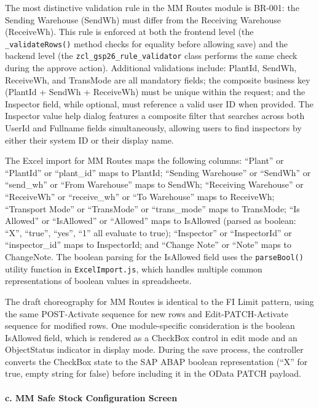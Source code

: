 \documentclass[12pt,a4paper]{report}
\begin{document}
The most distinctive validation rule in the MM Routes module is BR-001: the Sending Warehouse (SendWh) must differ from the Receiving Warehouse (ReceiveWh). This rule is enforced at both the frontend level (the \texttt{\_validateRows()} method checks for equality before allowing save) and the backend level (the \texttt{zcl\_gsp26\_rule\_validator} class performs the same check during the approve action). Additional validations include: PlantId, SendWh, ReceiveWh, and TransMode are all mandatory fields; the composite business key (PlantId + SendWh + ReceiveWh) must be unique within the request; and the Inspector field, while optional, must reference a valid user ID when provided. The Inspector value help dialog features a composite filter that searches across both UserId and Fullname fields simultaneously, allowing users to find inspectors by either their system ID or their display name.

The Excel import for MM Routes maps the following columns: ``Plant'' or ``PlantId'' or ``plant\_id'' maps to PlantId; ``Sending Warehouse'' or ``SendWh'' or ``send\_wh'' or ``From Warehouse'' maps to SendWh; ``Receiving Warehouse'' or ``ReceiveWh'' or ``receive\_wh'' or ``To Warehouse'' maps to ReceiveWh; ``Transport Mode'' or ``TransMode'' or ``trans\_mode'' maps to TransMode; ``Is Allowed'' or ``IsAllowed'' or ``Allowed'' maps to IsAllowed (parsed as boolean: ``X'', ``true'', ``yes'', ``1'' all evaluate to true); ``Inspector'' or ``InspectorId'' or ``inspector\_id'' maps to InspectorId; and ``Change Note'' or ``Note'' maps to ChangeNote. The boolean parsing for the IsAllowed field uses the \texttt{parseBool()} utility function in \texttt{ExcelImport.js}, which handles multiple common representations of boolean values in spreadsheets.

The draft choreography for MM Routes is identical to the FI Limit pattern, using the same POST-Activate sequence for new rows and Edit-PATCH-Activate sequence for modified rows. One module-specific consideration is the boolean IsAllowed field, which is rendered as a CheckBox control in edit mode and an ObjectStatus indicator in display mode. During the save process, the controller converts the CheckBox state to the SAP ABAP boolean representation (``X'' for true, empty string for false) before including it in the OData PATCH payload.

\paragraph{c. MM Safe Stock Configuration Screen}
\end{document}

